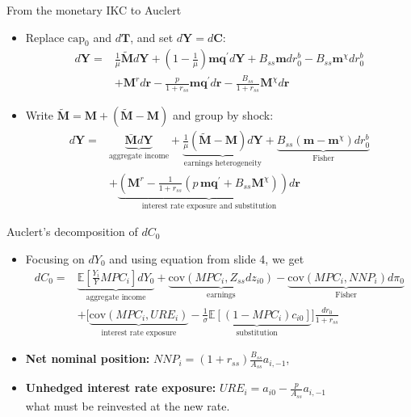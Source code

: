 \documentclass[10pt,english]{beamer}
\begin{document}
\begin{frame}{From the monetary IKC to Auclert}
\vspace{-1mm}
\begin{itemize}
\item <+->Replace $\text{cap}_{0}$ and $d\boldsymbol{T}$, and set $d\boldsymbol{Y}=d\boldsymbol{C}$:
{\small
\begin{align*}
d\boldsymbol{Y}= & \tfrac{1}{\mu}\tilde{\boldsymbol{M}}d\boldsymbol{Y}+\left(1-\tfrac{1}{\mu}\right)\boldsymbol{m}\boldsymbol{q}^{\prime}d\boldsymbol{Y}+B_{ss}\boldsymbol{m}dr_{0}^{b}-B_{ss}\boldsymbol{m}^{\chi}dr_{0}^{b}\\
 & +\boldsymbol{M}^{r}d\boldsymbol{r}-\tfrac{p}{1+r_{ss}}\boldsymbol{m}\boldsymbol{q}^{\prime}d\boldsymbol{r}-\tfrac{B_{ss}}{1+r_{ss}}\boldsymbol{M}^{\chi}d\boldsymbol{r}
\end{align*}
}
\item <+->Write $\tilde{\boldsymbol{M}}=\boldsymbol{M}+(\tilde{\boldsymbol{M}}-\boldsymbol{M})$ and group by shock:
{\small
\begin{align*}
d\boldsymbol{Y}= & \underbrace{\bar{\boldsymbol{M}}d\boldsymbol{Y}}_{\text{aggregate income}}+\underbrace{\tfrac{1}{\mu}(\tilde{\boldsymbol{M}}-\boldsymbol{M})d\boldsymbol{Y}}_{\text{earnings heterogeneity}}+\underbrace{B_{ss}\left(\boldsymbol{m}-\boldsymbol{m}^{\chi}\right)dr_{0}^{b}}_{\text{Fisher}}\\
 & +\underbrace{\left(\boldsymbol{M}^{r}-\tfrac{1}{1+r_{ss}}\left(p\,\boldsymbol{m}\boldsymbol{q}^{\prime}+B_{ss}\boldsymbol{M}^{\chi}\right)\right)d\boldsymbol{r}}_{\text{interest rate exposure and substitution}}
\end{align*}
}
\end{itemize}
\end{frame}
%
\begin{frame}{Auclert's decomposition of $dC_{0}$}
\vspace{-1mm}
\begin{itemize}
\item Focusing on $dY_{0}$ and using equation from slide 4,  we get
{\small
\begin{align*}
dC_{0}= & \underbrace{\mathbb{E}\left[\tfrac{Y_{i}}{Y}MPC_{i}\right]dY_{0}}_{\text{aggregate income}}+\underbrace{\text{cov}\left(MPC_{i},Z_{ss}dz_{i0}\right)}_{\text{earnings}}-\underbrace{\text{cov}\left(MPC_{i},NNP_{i}\right)d\pi_{0}}_{\text{Fisher}}\\
 & +\Big[\underbrace{\text{cov}\left(MPC_{i},URE_{i}\right)}_{\text{interest rate exposure}}-\underbrace{\tfrac{1}{\sigma}\mathbb{E}\left[\left(1-MPC_{i}\right)c_{i0}\right]}_{\text{substitution}}\Big]\frac{dr_{0}}{1+r_{ss}}
\end{align*}
}
\item <+->\textbf{Net nominal position:} $NNP_{i}=(1+r_{ss})\frac{B_{ss}}{A_{ss}}a_{i,-1}$,
\item <+->\textbf{Unhedged interest rate exposure:} $URE_{i}=a_{i0}-\frac{p}{A_{ss}}a_{i,-1}$ \\ what must be reinvested at the new rate.
\end{itemize}
\end{frame}
\end{document}
